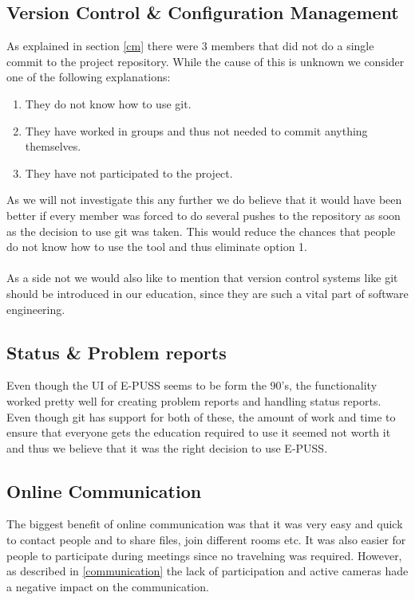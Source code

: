 \documentclass{article}
\begin{document}
    \subsection{Version Control \& Configuration Management}
        As explained in section \ref{cm} there were 3 members that did not do a single
        commit to the project repository. While the cause of this is unknown we consider
        one of the following explanations:
        \begin{enumerate}
            \item They do not know how to use git.
            \item They have worked in groups and thus not needed to commit anything themselves.
            \item They have not participated to the project.
        \end{enumerate}
        As we will not investigate this any further we do believe that it would have been
        better if every member was forced to do several pushes to the repository as soon
        as the decision to use git was taken. This would reduce the chances that people
        do not know how to use the tool and thus eliminate option 1. 
        \\ \\
        As a side not we would also like to mention that version control systems like git
        should be introduced in our education, since they are such a vital part of 
        software engineering.
    
    \subsection{Status \& Problem reports}
        Even though the UI of E-PUSS seems to be form the 90's, the functionality worked
        pretty well for creating problem reports and handling status reports.
        Even though git has support for both of these, the amount of work and time to ensure
        that everyone gets the education required to use it seemed not worth it and thus
        we believe that it was the right decision to use E-PUSS.
    
    \subsection{Online Communication}
        The biggest benefit of online communication was that it was very easy and quick to
        contact people and to share files, join different rooms etc. It was also easier for
        people to participate during meetings since no travelning was required.
        However, as described in \ref{communication} the lack of participation and active cameras
        hade a negative impact on the communication.
    
\end{document}
